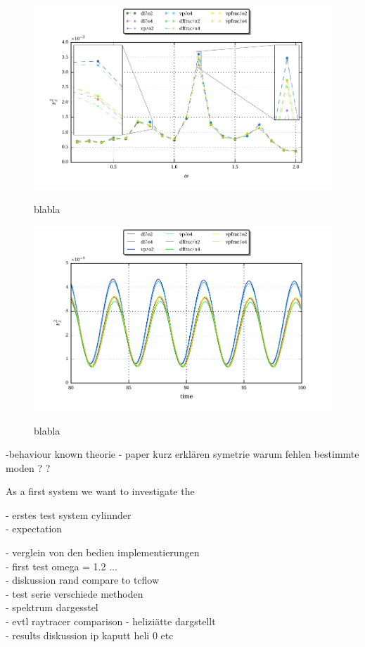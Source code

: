 \begin{figure}[!pt]
  \centering
  \includegraphics{gfx/cone/cylinder/cylinder.pdf}\label{fig:cone:cyl}
  \caption{blabla}

  \includegraphics{gfx/cone/cylinder/cyl_vz.pdf}\label{fig:cone:cyl_time}
  \caption{blabla}
\end{figure}
\newpage

-behaviour known theorie
- paper kurz erklären symetrie warum fehlen bestimmte moden ? ?

As a first system we want to investigate the

- erstes test system cylinnder\\
- expectation

- verglein von den bedien implementierungen\\
- first test omega = 1.2 ...\\
- diskussion rand compare to tcflow \\
- test serie verschiede methoden\\
- spektrum dargesstel\\
- evtl raytracer  comparison
- heliziätte dargstellt\\
- results diskussion ip kaputt heli 0 etc \\

